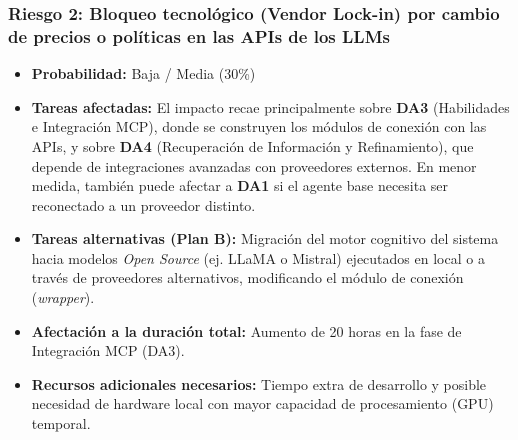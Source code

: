 \documentclass[11pt, letterpaper]{article}
\begin{document}
\subsubsection{Riesgo 2: Bloqueo tecnológico (Vendor Lock-in) por cambio de precios o políticas en las APIs de los LLMs}
\label{sec:riesgo2}
\begin{itemize}
    \item \textbf{Probabilidad:} Baja / Media (30\%) \cite{opara_vendor_lockin_2016}
    \item \textbf{Tareas afectadas:} El impacto recae principalmente sobre \textbf{DA3} (Habilidades e Integración MCP), donde se construyen los módulos de conexión con las APIs, y sobre \textbf{DA4} (Recuperación de Información y Refinamiento), que depende de integraciones avanzadas con proveedores externos. En menor medida, también puede afectar a \textbf{DA1} si el agente base necesita ser reconectado a un proveedor distinto.
    \item \textbf{Tareas alternativas (Plan B):} Migración del motor cognitivo del sistema hacia modelos \textit{Open Source} (ej. LLaMA o Mistral) ejecutados en local o a través de proveedores alternativos, modificando el módulo de conexión (\textit{wrapper}).
    \item \textbf{Afectación a la duración total:} Aumento de 20 horas en la fase de Integración MCP (DA3).
    \item \textbf{Recursos adicionales necesarios:} Tiempo extra de desarrollo y posible necesidad de hardware local con mayor capacidad de procesamiento (GPU) temporal.
\end{itemize}
\end{document}
